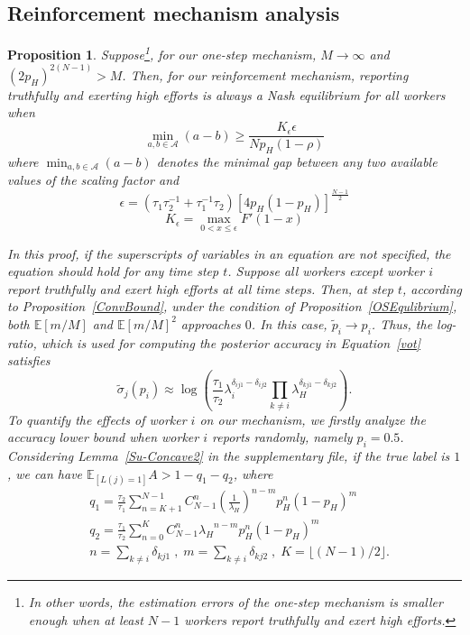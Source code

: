 \documentclass{article}
\makeatletter
\newtheorem{proposition}[theorem]{Proposition}
\renewenvironment{proof}[1][\proofname]{\par
  \vspace{-\topsep}%
  \pushQED{\qed}%
  \normalfont
  \topsep0pt \partopsep0pt %
  \trivlist
  \item[\hskip\labelsep
        \itshape
    #1\@addpunct{.}]\ignorespaces
}{%
  \popQED\endtrivlist\@endpefalse
  \addvspace{0pt plus 0pt} %
}
\makeatother
\begin{document}
\subsection{Reinforcement mechanism analysis}
\begin{proposition}
\label{RMNE}
Suppose\footnote{In other words, the estimation errors of the one-step mechanism is smaller enough when at least $N-1$ workers report truthfully and exert high efforts.}, for our one-step mechanism, $M\rightarrow \infty$ and $(2p_H)^{2(N-1)}>M$. Then, for our reinforcement mechanism, reporting truthfully and exerting high efforts is always a Nash equilibrium for all workers when
$$ {\min}_{a,b\in\mathcal{A}}(a-b) \geq \frac{K_{\epsilon} \epsilon}{Np_H(1-\rho)}$$
where $\min_{a,b\in\mathcal{A}}(a-b)$ denotes the minimal gap between any two available values of the scaling factor and
$$\epsilon =(\tau_1\tau_2^{-1}+\tau_1^{-1}\tau_2)[4p_H(1-p_H)]^{\frac{N-1}{2}} $$
$$K_{\epsilon}={\max}_{0<x\leq \epsilon}F'(1-x)$$
\begin{proof}
In this proof, if the superscripts of variables in an equation are not specified, the equation should hold for any time step $t$. Suppose all workers except worker $i$ report truthfully and exert high efforts at all time steps.
Then, at step $t$, according to Proposition~\ref{ConvBound}, under the condition of Proposition~\ref{OSEqulibrium}, 
both $\mathbb{E}[m/M]$ and $\mathbb{E}[m/M]^2$ approaches $0$.
In this case, $\tilde{p}_i\rightarrow p_i$. Thus, the log-ratio, which is used for computing the posterior accuracy in Equation~\ref{vot} satisfies
\begin{equation}
\label{ProbRatioApp}
\tilde{\sigma}_j(p_i)\approx \log\left(\frac{\tau_{1}}{\tau_{2}}\lambda_i^{\delta_{ij1}-\delta_{ij2}}{\prod}_{k\neq i}\lambda_H^{\delta_{kj1}-\delta_{kj2}}\right).
\end{equation}
To quantify the effects of worker $i$ on our mechanism, we firstly analyze the accuracy lower bound when worker $i$ reports randomly, namely $p_i=0.5$. Considering Lemma~\ref{Su-Concave2} in the supplementary file, if the true label is $1$, we can have $\mathbb{E}_{[L(j)=1]}A> 1-q_1-q_2$, where
\begin{equation*}
\begin{split}
&q_1 = \frac{\tau_2}{\tau_1}{\sum}_{n=K+1}^{N-1}C_{N-1}^{n} (\frac{1}{\lambda_H})^{n-m}p_H^n(1-p_H)^m\\
&q_2 = \frac{\tau_1}{\tau_2}{\sum}_{n=0}^{K}C_{N-1}^{n} {\lambda_H}^{n-m}p_H^n(1-p_H)^m\\
&n={\sum}_{k\neq i}\delta_{kj1}\;,\;m= {\sum}_{k\neq i}\delta_{kj2}\;,\;K=\lfloor (N-1)/2 \rfloor.

\end{split}
\end{equation*}
\end{proof}
\end{proposition}
\end{document}
